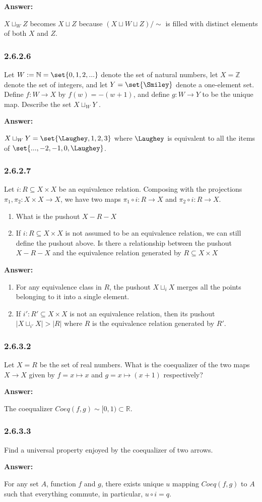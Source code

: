 \documentclass{article}
\newcommand{\N}{\mathbb{N}}
\newcommand{\Rat}{\mathbb{R}}
\newcommand{\vsp}[0]{\vspace*{10pt}\par}
\newcommand{\exercise}[1]{\subsubsection*{#1}}
\newcommand{\ans}[0]{\vsp\textbf{Answer: }\vsp}
\newcommand{\ei}{\item}
\newcommand{\es}{\begin{enumerate}[label=(\alph*)]\ei}
\newcommand{\ee}{\end{enumerate}}
\begin{document}
\ans

$X \sqcup_W Z$ becomes $X \sqcup Z$ because $(X \sqcup W \sqcup Z)/\sim$ is
filled with distinct elements of both $X$ and $Z$.

\exercise{2.6.2.6}

Let $W := \N = \set{0,1,2,... }$ denote the set of natural numbers, let $X =
\mathbb{Z}$ denote the set of integers, and let $Y = \set{\Smiley}$ denote a
one-element set. Define $f : W \to X$ by $f(w) = -(w+1)$, and define $g: W \to Y$ to be
the unique map. Describe the set $X \sqcup_W Y$ .

\ans

$X \sqcup_W Y = \set{\Laughey, 1, 2, 3}$ where $\Laughey$ is equivalent to all
the items of $\set{..., -2, -1, 0, \Laughey}$.

\exercise{2.6.2.7}

Let $i: R \subseteq X \times X$ be an equivalence relation. Composing with the
projections $\pi_1, \pi_2 : X \times X \to X$, we have two maps $\pi_1 \circ i :
R \to X$ and $\pi_2 \circ i: R \to X$.

\es What is the pushout $X - R - X$
\ei If $i: R \subseteq X \times X$ is not assumed to be an equivalence relation,
    we can still define the pushout above. Is there a relationship between the
    pushout $X - R - X$ and the equivalence relation generated by $R \subseteq X
    \times X$
\ee

\ans

\es For any equivalence class in $R$, the pushout $X \sqcup_{i} X$ merges all
    the points belonging to it into a single element.
\ei If $i' : R' \subseteq X \times X$ is not an equivalence relation, then its
    pushout $|X \sqcup_{i'} X| > |R|$ where $R$ is the equivalence relation
    generated by $R'$.
\ee

\exercise{2.6.3.2}

Let $X = R$ be the set of real numbers. What is the coequalizer of the two maps
$X \to X$ given by $f = x \mapsto x$ and $g = x \mapsto (x + 1)$ respectively?

\ans

The coequalizer $Coeq(f,g) \sim [0,1) \subset \Rat$.

\exercise{2.6.3.3}

Find a universal property enjoyed by the coequalizer of two arrows.

\ans

For any set $A$, function $f$ and $g$, there exists unique $u$ mapping
$Coeq(f,g)$ to $A$ such that everything commute, in particular, $u \circ i = q$.
\end{document}
